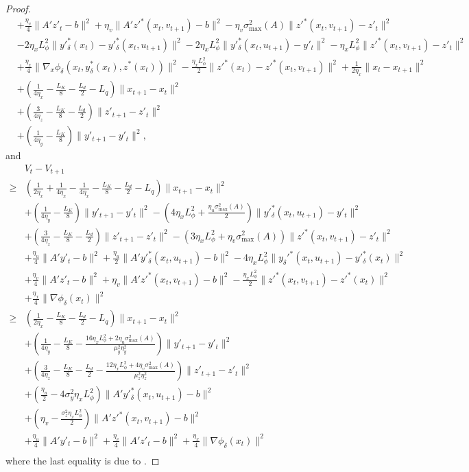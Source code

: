 \documentclass{article}
\newcommand{\pth}[1]{\left( #1 \right)}
\theoremstyle{plain}
\theoremstyle{definition}
\theoremstyle{remark}
\begin{document}
\begin{proof}
\begin{align*}
    &+\frac{\eta_v}{4}\|A'z'_t-b\|^2+\eta_v\|A'z'^*(x_{t},v_{t+1})-b\|^2-\eta_v \sigma_{\max}^2(A) \|z'^*(x_t,v_{t+1})-z'_t\|^2\\
    &-2\eta_xL_\phi^2\|y'^*_\delta(x_t)-y'^*_\delta(x_t,u_{t+1})\|^2-2\eta_xL_\phi^2\|y'^*_\delta(x_t,u_{t+1})-y'_t\|^2-\eta_xL_\phi^2\|z'^*(x_t, v_{t+1})-z'_t\|^2\\
    &+\frac{\eta_x}{4}\|\nabla_x \phi_\delta(x_t, y^*_\delta(x_t), z^*(x_t))\|^2-\frac{\eta_xL_\phi^2}{2}\|z'^*(x_t)-z'^*(x_t, v_{t+1})\|^2+\frac{1}{2\eta_x}\|x_t-x_{t+1}\|^2\\
    &+\pth{\frac{1}{4\eta_x}-\frac{L_K}{8}-\frac{L_d}{2}-L_q}\|x_{t+1}-x_t\|^2\\
    &+\pth{\frac{3}{4\eta_z}-\frac{L_K}{8}-\frac{L_d}{2}}\|z'_{t+1}-z'_t\|^2\\
    &+\pth{\frac{1}{4\eta_y}-\frac{L_K}{8}}\|y'_{t+1}-y'_t\|^2,
\end{align*}
and
\begin{align*}
    &V_t-V_{t+1}\\
    \geq&\pth{\frac{1}{2\eta_x}+\frac{1}{4\eta_x}-\frac{1}{4\eta_x}-\frac{L_K}{8}-\frac{L_d}{2}-L_q}\|x_{t+1}-x_t\|^2\\
    &+\pth{\frac{1}{4\eta_y}-\frac{L_K}{8}}\|y'_{t+1}-y'_t\|^2-\pth{4\eta_xL_\phi^2+\frac{\eta_u \sigma_{\max}^2(A)}{2}}\|y'^*_\delta(x_t,u_{t+1})-y'_t\|^2\\
    &+\pth{\frac{3}{4\eta_z}-\frac{L_K}{8}-\frac{L_d}{2}}\|z'_{t+1}-z'_t\|^2-\pth{3\eta_xL_\phi^2+\eta_v \sigma_{\max}^2(A)}\|z'^*(x_t,v_{t+1})-z'_t\|^2\\
    &+\frac{\eta_u}{4}\|A'y'_t-b\|^2+\frac{\eta_u}{2}\|A'y'^*_\delta(x_t,u_{t+1})-b\|^2-4\eta_xL_\phi^2\|y_\delta'^*(x_t,u_{t+1})-y'^*_\delta(x_t)\|^2\\
    &+\frac{\eta_v}{4}\|A'z'_t-b\|^2+\eta_v\|A'z'^*(x_t,v_{t+1})-b\|^2-\frac{\eta_xL_\phi^2}{2}\|z'^*(x_t, v_{t+1})-z'^*(x_t)\|^2\\
    &+\frac{\eta_x}{4}\|\nabla \phi_\delta(x_t)\|^2\\
    \geq&\pth{\frac{1}{2\eta_x}-\frac{L_K}{8}-\frac{L_d}{2}-L_q}\|x_{t+1}-x_t\|^2\\
    &+\pth{\frac{1}{4\eta_y}-\frac{L_K}{8}-\frac{16\eta_xL_\phi^2+2\eta_u\sigma_{\max}^2(A)}{\mu_y^2\eta_y^2}}\|y'_{t+1}-y'_t\|^2\\
    &+\pth{\frac{3}{4\eta_z}-\frac{L_K}{8}-\frac{L_d}{2}-\frac{12\eta_xL_\phi^2+4\eta_v\sigma_{\max}^2(A)}{\mu_z^2\eta_z^2}}\|z'_{t+1}-z'_t\|^2\\
    &+\pth{\frac{\eta_u}{2}-4\sigma_y^2\eta_xL_\phi^2}\|A'y'^*_\delta(x_t,u_{t+1})-b\|^2\\
    &+\pth{\eta_v-\frac{\sigma_z^2\eta_xL_\phi^2}{2}}\|A'z'^*(x_t,v_{t+1})-b\|^2\\
    &+\frac{\eta_u}{4}\|A'y'_t-b\|^2+\frac{\eta_v}{4}\|A'z'_t-b\|^2+\frac{\eta_x}{4}\|\nabla \phi_\delta(x_t)\|^2\\
\end{align*}
where the last equality is due to . 


\end{proof}
\end{document}
